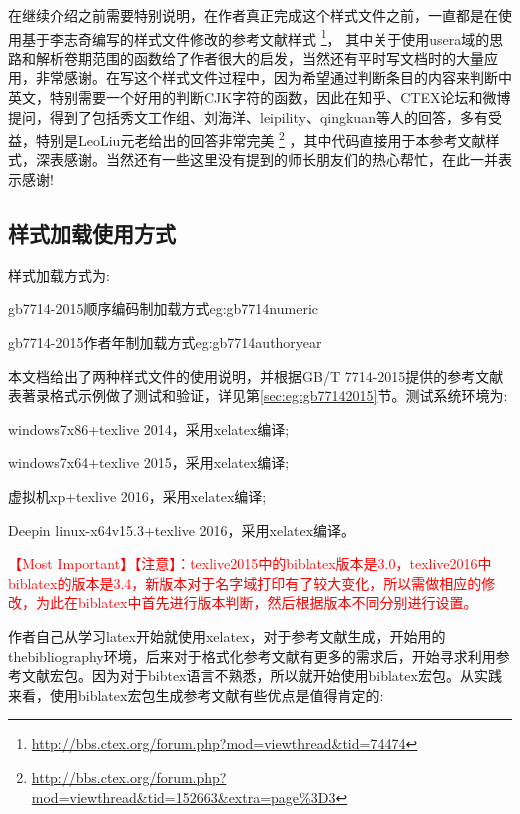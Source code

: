 在继续介绍之前需要特别说明，在作者真正完成这个样式文件之前，一直都是在使用基于李志奇编写的样式文件修改的参考文献样式
\footnote{\url{http://bbs.ctex.org/forum.php?mod=viewthread&tid=74474}}，
其中关于使用usera域的思路和解析卷期范围的函数给了作者很大的启发，当然还有平时写文档时的大量应用，非常感谢。在写这个样式文件过程中，因为希望通过判断条目的内容来判断中英文，特别需要一个好用的判断CJK字符的函数，因此在知乎、CTEX论坛和微博提问，得到了包括秀文工作组、刘海洋、leipility、qingkuan等人的回答，多有受益，特别是LeoLiu元老给出的回答非常完美
\footnote{\url{http://bbs.ctex.org/forum.php?mod=viewthread&tid=152663&extra=page\%3D3}}
，其中代码直接用于本参考文献样式，深表感谢。当然还有一些这里没有提到的师长朋友们的热心帮忙，在此一并表示感谢!

\subsection{样式加载使用方式}
样式加载方式为:

\begin{codetex}{gb7714-2015顺序编码制加载方式}{eg:gb7714numeric}
\usepackage[backend=biber,style=gb7714-2015]{biblatex}
\end{codetex}

\begin{codetex}{gb7714-2015作者年制加载方式}{eg:gb7714authoryear}
\usepackage[backend=biber,style=gb7714-2015ay]{biblatex}
\end{codetex}

本文档给出了两种样式文件的使用说明，并根据GB/T 7714-2015提供的参考文献表著录格式示例做了测试和验证，详见第\ref{sec:eg:gb77142015}节。测试系统环境为:

windows7x86+texlive 2014，采用xelatex编译;

windows7x64+texlive 2015，采用xelatex编译;

虚拟机xp+texlive 2016，采用xelatex编译;

Deepin linux-x64v15.3+texlive 2016，采用xelatex编译。

\textcolor{red}{\HandRight \heiti 【Most Important】【注意】：texlive2015中的biblatex版本是3.0，texlive2016中biblatex的版本是3.4，新版本对于名字域打印有了较大变化，所以需做相应的修改，为此在biblatex中首先进行版本判断，然后根据版本不同分别进行设置。}

作者自己从学习latex开始就使用xelatex，对于参考文献生成，开始用的thebibliography环境，后来对于格式化参考文献有更多的需求后，开始寻求利用参考文献宏包。因为对于bibtex语言不熟悉，所以就开始使用biblatex宏包。从实践来看，使用biblatex宏包生成参考文献有些优点是值得肯定的:

